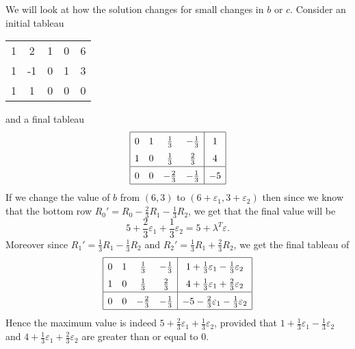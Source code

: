 \documentclass[12pt]{article}
\theoremstyle{definition}
\theoremstyle{remark}
\begin{document}
We will look at how the solution changes for small changes in $b$ or $c$. Consider an initial tableau
\begin{center}
	\begin{tabular}{|cccc|c|}
		\hline
		1 & 2 & 1 & 0 & 6 \\
		1 & -1 & 0 & 1 & 3 \\
		\hline
		1 & 1 & 0 & 0 & 0 \\
		\hline
	\end{tabular}
\end{center}
and a final tableau
\[
\renewcommand{\arraystretch}{1.5}
\begin{array}{|cccc|c|}
	\hline
	0 & 1 & \frac{1}{3} & -\frac{1}{3} & 1 \\
	1 & 0 & \frac{1}{3} & \frac{2}{3} & 4 \\
	\hline
	0 & 0 & -\frac{2}{3} & -\frac{1}{3} & -5 \\
	\hline
\end{array}
\renewcommand{\arraystretch}{1}
\] 
If we change the value of $b$ from $(6, 3)$ to $(6 + \varepsilon_{1}, 3 + \varepsilon_{2})$ then since we know that the bottom row $R_0' = R_0 - \frac{2}{3}R_1 - \frac{1}{3}R_2$, we get that the final value will be
\[
5 + \frac{2}{3} \varepsilon_1 + \frac{1}{3} \varepsilon_2 = 5 + \lambda^{T}\varepsilon
.\]
Moreover since $R_1' = \frac{1}{3}R_1 - \frac{1}{3}R_2$ and $R_2' = \frac{1}{3}R_1 + \frac{2}{3}R_2$, we get the final tableau of
\[
\renewcommand{\arraystretch}{1.5}
\begin{array}{|cccc|c|}
	\hline
	0 & 1 & \frac{1}{3} & -\frac{1}{3} & 1 + \frac{1}{3}\varepsilon_1 - \frac{1}{3}\varepsilon_2 \\
	1 & 0 & \frac{1}{3} & \frac{2}{3} & 4 + \frac{1}{3}\varepsilon_1 + \frac{2}{3}\varepsilon_2 \\
	\hline
	0 & 0 & -\frac{2}{3} & -\frac{1}{3} & -5 - \frac{2}{3}\varepsilon_1 - \frac{1}{3}\varepsilon_2 \\
	\hline
\end{array}
\renewcommand{\arraystretch}{1}
\] 
Hence the maximum value is indeed $5 + \frac{2}{3}\varepsilon_1 + \frac{1}{3}\varepsilon_2$, provided that $1 + \frac{1}{3}\varepsilon_1 - \frac{1}{3}\varepsilon_2$ and $4 + \frac{1}{3}\varepsilon_1 + \frac{2}{3}\varepsilon_2$ are greater than or equal to $0$.
\end{document}
